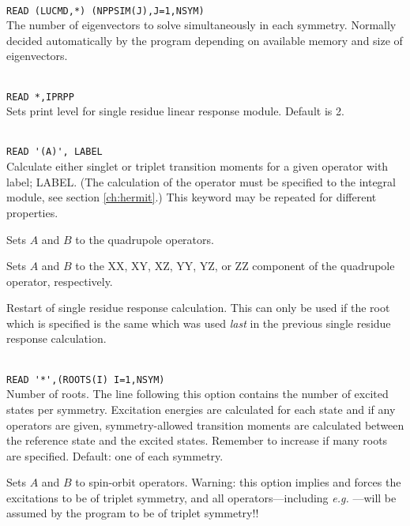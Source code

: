 \begin{description}
\item{}\\
\verb|READ (LUCMD,*) (NPPSIM(J),J=1,NSYM)|\\
The number of eigenvectors to solve simultaneously in each
symmetry. Normally decided automatically by the program depending on
available memory and size of eigenvectors.

\item{}\\
\verb|READ *,IPRPP|\\
Sets print level for single residue linear response module. Default is 2.

\item{}\\
\verb|READ '(A)', LABEL|\\
Calculate either singlet or triplet transition moments for a given operator with label; LABEL.
(The calculation of the operator must be specified to the integral
module, see section \ref{ch:hermit}.)
This keyword may be repeated for different properties.

\item{}
Sets $A$ and $B$ to the quadrupole operators.

\item{}
Sets $A$ and $B$ to the XX, XY, XZ, YY, YZ, or ZZ component of the
quadrupole operator, respectively.

\item{}
Restart of single residue response
calculation. This can only be used if the root which is
specified is the same which was used \textit{last} in the previous
single residue response calculation.

\item{}\\
\verb|READ '*',(ROOTS(I) I=1,NSYM)|\\
Number of roots.  The line following this option contains the number
of excited states per symmetry. Excitation
energies are calculated for each state and if
any operators are given,
symmetry-allowed transition moments are
calculated between the
reference state and the excited states.
Remember to increase  if many roots are specified.
Default: one of each symmetry.

\item{}
Sets $A$ and $B$ to spin-orbit operators.
Warning: this option implies  and
forces the excitations to be of triplet symmetry,
and all operators---including
{\it e.g.\/} ---will be assumed by the program to be of triplet symmetry!!


\end{description}
